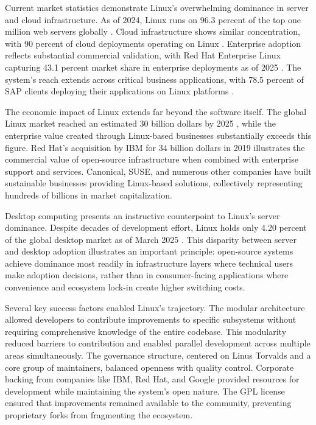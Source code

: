 Current market statistics demonstrate Linux's overwhelming dominance in server and cloud infrastructure. As of 2024, Linux runs on 96.3 percent of the top one million web servers globally \cite{linux_truelist2024}. Cloud infrastructure shows similar concentration, with 90 percent of cloud deployments operating on Linux \cite{linux_enterpriseapps2017}. Enterprise adoption reflects substantial commercial validation, with Red Hat Enterprise Linux capturing 43.1 percent market share in enterprise deployments as of 2025 \cite{linux_sqmagazine2025}. The system's reach extends across critical business applications, with 78.5 percent of SAP clients deploying their applications on Linux platforms \cite{linux_sqmagazine2025}.

The economic impact of Linux extends far beyond the software itself. The global Linux market reached an estimated 30 billion dollars by 2025 \cite{linux_scitech2025}, while the enterprise value created through Linux-based businesses substantially exceeds this figure. Red Hat's acquisition by IBM for 34 billion dollars in 2019 illustrates the commercial value of open-source infrastructure when combined with enterprise support and services. Canonical, SUSE, and numerous other companies have built sustainable businesses providing Linux-based solutions, collectively representing hundreds of billions in market capitalization.

Desktop computing presents an instructive counterpoint to Linux's server dominance. Despite decades of development effort, Linux holds only 4.20 percent of the global desktop market as of March 2025 \cite{linux_wikipedia2025}. This disparity between server and desktop adoption illustrates an important principle: open-source systems achieve dominance most readily in infrastructure layers where technical users make adoption decisions, rather than in consumer-facing applications where convenience and ecosystem lock-in create higher switching costs.

Several key success factors enabled Linux's trajectory. The modular architecture allowed developers to contribute improvements to specific subsystems without requiring comprehensive knowledge of the entire codebase. This modularity reduced barriers to contribution and enabled parallel development across multiple areas simultaneously. The governance structure, centered on Linus Torvalds and a core group of maintainers, balanced openness with quality control. Corporate backing from companies like IBM, Red Hat, and Google provided resources for development while maintaining the system's open nature. The GPL license ensured that improvements remained available to the community, preventing proprietary forks from fragmenting the ecosystem.

